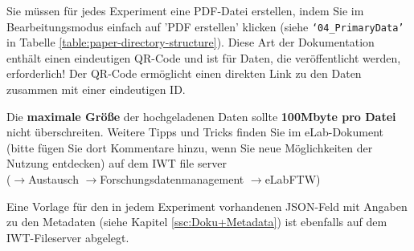 Sie müssen für jedes Experiment eine PDF-Datei erstellen, indem Sie im Bearbeitungsmodus einfach auf 'PDF erstellen' klicken (siehe
\texttt{‘04\_PrimaryData’} in Tabelle \ref{table:paper-directory-structure}).
Diese Art der Dokumentation enthält einen eindeutigen QR-Code und ist für Daten,
die veröffentlicht werden, erforderlich! Der QR-Code ermöglicht einen direkten
Link zu den Daten zusammen mit einer eindeutigen ID.

Die \textbf{maximale Größe} der hochgeladenen Daten sollte \textbf{100Mbyte pro Datei} nicht überschreiten. Weitere Tipps und Tricks finden Sie im eLab-Dokument (bitte fügen Sie dort Kommentare hinzu, wenn Sie neue Möglichkeiten der Nutzung entdecken) auf dem IWT file server   \\ ($\rightarrow$Austausch $\rightarrow$Forschungsdatenmanagement $\rightarrow$eLabFTW)

Eine Vorlage für den in jedem Experiment vorhandenen JSON-Feld mit Angaben zu den Metadaten (siehe Kapitel \ref{ssc:Doku+Metadata}) ist ebenfalls auf dem IWT-Fileserver abgelegt.
